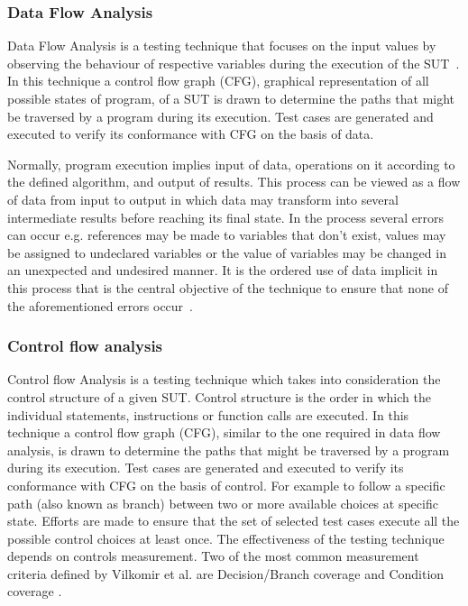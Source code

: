 \subsubsection{Data Flow Analysis}
Data Flow Analysis is a testing technique that focuses on the input values by observing the behaviour of respective variables during the execution of the SUT~\cite{clarke1989formal}. In this technique a control flow graph (CFG), graphical representation of all possible states of program, of a SUT is drawn to determine the paths that might be traversed by a program during its execution. Test cases are generated and executed to verify its conformance with CFG on the basis of data. 

\noindent Normally, program execution implies input of data, operations on it according to the defined algorithm, and output of results. This process can be viewed as a flow of data from input to output in which data may transform into several intermediate results before reaching its final state. In the process several errors can occur e.g. references may be made to variables that don’t exist, values may be assigned to undeclared variables or the value of variables may be changed in an unexpected and undesired manner. It is the ordered use of data implicit in this process that is the central objective of the technique to ensure that none of the aforementioned errors occur~\cite{fosdick1976data}.

\subsubsection{Control flow analysis}
Control flow Analysis is a testing technique which takes into consideration the control structure of a given SUT. Control structure is the order in which the individual statements, instructions or function calls are executed. In this technique a control flow graph (CFG), similar to the one required in data flow analysis, is drawn to determine the paths that might be traversed by a program during its execution. Test cases are generated and executed to verify its conformance with CFG on the basis of control. For example to follow a specific path (also known as branch) between two or more available choices at specific state. Efforts are made to ensure that the set of selected test cases execute all the possible control choices at least once. The effectiveness of the testing technique depends on controls measurement. Two of the most common measurement criteria defined by Vilkomir et al. are Decision/Branch coverage and Condition coverage \cite{vilkomir2003tolerance}. 

